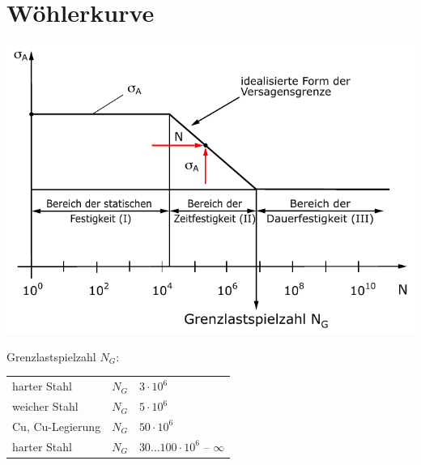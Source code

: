 \section{Wöhlerkurve} %
	\includegraphics[width=\columnwidth]{graphics/woehler}
	
	Grenzlastspielzahl $N_G$: \\
	\begin{tabular}{lr@{$\:\approx\:$}l}
		harter Stahl & $N_G$ & $3 \cdot 10^6$ \\
		weicher Stahl & $N_G$ & $5 \cdot 10^6$ \\
		Cu, Cu-Legierung & $N_G$ & $50 \cdot 10^6$ \\
		harter Stahl & $N_G$ & $30\dots 100 \cdot 10^6$ -- $\infty$ \\
	\end{tabular}
